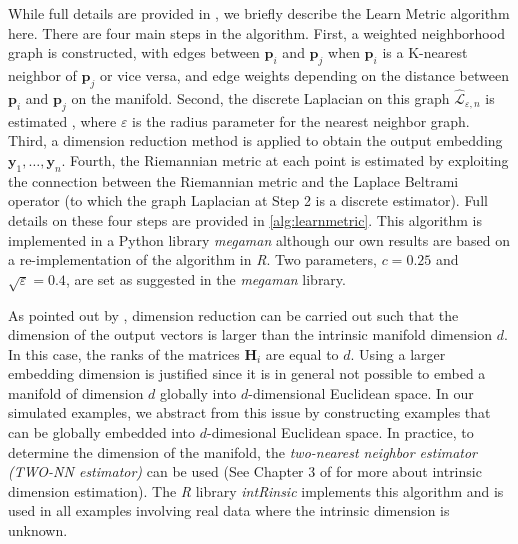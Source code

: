 \documentclass[11pt,a4paper,]{article}
\begin{document}
While full details are provided in \textcite{Perrault-Joncas2013-pq}, we briefly describe the Learn Metric algorithm here. There are four main steps in the algorithm. First, a weighted neighborhood graph is constructed, with edges between \(\pmb{p}_i\) and \(\pmb{p}_j\) when \(\pmb{p}_i\) is a K-nearest neighbor of \(\pmb{p}_j\) or vice versa, and edge weights depending on the distance between \(\pmb{p}_i\) and \(\pmb{p}_j\) on the manifold. Second, the discrete Laplacian on this graph \(\hat{\mathcal{L}}_{\varepsilon,n}\) is estimated \autocite{Zhou2011-za}, where \(\varepsilon\) is the radius parameter for the nearest neighbor graph. Third, a dimension reduction method is applied to obtain the output embedding \(\pmb{y}_1,\dots,\pmb{y}_n\). Fourth, the Riemannian metric at each point is estimated by exploiting the connection between the Riemannian metric and the Laplace Beltrami operator (to which the graph Laplacian at Step 2 is a discrete estimator). Full details on these four steps are provided in \autoref{alg:learnmetric}. This algorithm is implemented in a Python library \emph{megaman} \autocite{McQueen2016-xz} although our own results are based on a re-implementation of the algorithm in \emph{R}. Two parameters, \(c=0.25\) and \(\sqrt{\varepsilon} = 0.4\), are set as suggested in the \emph{megaman} library.

As pointed out by \textcite{Perrault-Joncas2013-pq}, dimension reduction can be carried out such that the dimension of the output vectors is larger than the intrinsic manifold dimension \(d\). In this case, the ranks of the matrices \(\pmb{H}_i\) are equal to \(d\). Using a larger embedding dimension is justified since it is in general not possible to embed a manifold of dimension \(d\) globally into \(d\)-dimensional Euclidean space. In our simulated examples, we abstract from this issue by constructing examples that can be globally embedded into \(d\)-dimesional Euclidean space. In practice, to determine the dimension of the manifold, the \emph{two-nearest neighbor estimator (TWO-NN estimator)} \autocite{Facco2017-rl,Denti2021-jl} can be used (See Chapter 3 of \textcite{Lee2007-wq} for more about intrinsic dimension estimation). The \emph{R} library \emph{intRinsic} \autocite{Denti2021-qc} implements this algorithm and is used in all examples involving real data where the intrinsic dimension is unknown.
\end{document}
